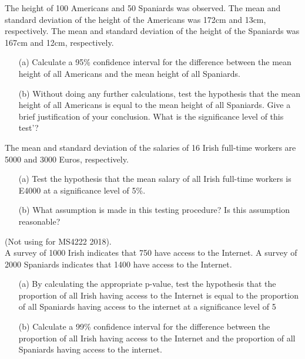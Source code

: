 
The height of 100 Americans and 50 Spaniards was observed. The mean and
standard deviation of the height of the Americans was 172cm and 13cm,
respectively. The mean and standard deviation of the height of the Spaniards
was 167cm and 12cm, respectively.

\begin{itemize}
\item[(a)]Calculate a 95\% confidence interval for the difference between the mean height
of all Americans and the mean height of all Spaniards.


\item[(b)] Without doing any further calculations, test the hypothesis that the mean
height of all Americans is equal to the mean height of all Spaniards. Give a brief
justification of your conclusion. What is the significance level of this test'?
\end{itemize}

\item 
The mean and standard deviation of the salaries of 16 Irish full-time workers are 5000 and 3000 Euros, respectively.
\begin{itemize}
\item[(a)] Test the hypothesis that the mean salary of all Irish full-time workers is E4000 at a significance level of 5\%.
\item[(b)] What assumption is made in this testing procedure? Is this assumption reasonable?
\end{itemize}
\item (Not using for MS4222 2018).\\
A survey of 1000 Irish indicates that 750 have access to the Internet. A survey of 2000 Spaniards
indicates that 1400 have access to the Internet.
\begin{itemize}
\item[(a)]  By calculating the appropriate p-value, test the hypothesis that the proportion of all Irish
having access to the Internet is equal to the proportion of all Spaniards having access to the
internet at a significance level of 5%

\item[(b)] Calculate a 99\% confidence interval for the difference between the proportion of all Irish
having access to the Internet and the proportion of all Spaniards having access to the
internet.
\end{itemize}


